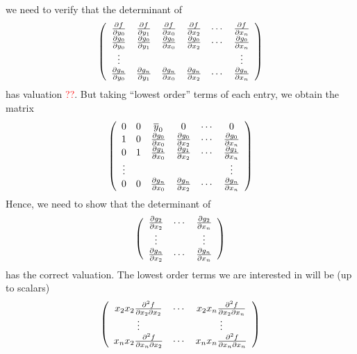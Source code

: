 \documentclass[oneside]{amsart}
\theoremstyle{definition}
\newcommand{\nathan}[1]{\textcolor{red}{#1}}
\begin{document}
we need to verify that the determinant of 
\[
\left(
\begin{array}{c c c c c c}
\frac{\partial f}{\partial y_0} &  \frac{\partial f}{\partial y_1} &  \frac{\partial f}{\partial x_0}  & \frac{\partial f}{\partial x_2} &\cdots &\frac{\partial f}{\partial x_n}\\
\frac{\partial g_0}{\partial y_0} &  \frac{\partial g_0}{\partial y_1} &  \frac{\partial g_0}{\partial x_0}  & \frac{\partial g_0}{\partial x_2} &\cdots &\frac{\partial g_0}{\partial x_n}\\

\vdots&&&&&\vdots\\
\frac{\partial g_n}{\partial y_0} &  \frac{\partial g_n}{\partial y_1} &  \frac{\partial g_n}{\partial x_0}  & \frac{\partial g_n}{\partial x_2} &\cdots &\frac{\partial g_n}{\partial x_n}\\
\end{array}
\right)
\]
has valuation \nathan{??}. But taking ``lowest order'' terms of each entry, we obtain the matrix 
\[
\left(
\begin{array}{c c c c c c}
0 &  0 &  \overline{y}_0  & 0 &\cdots & 0\\
1 &  0 &  \frac{\partial g_0}{\partial x_0}  & \frac{\partial g_0}{\partial x_2} &\cdots &\frac{\partial g_0}{\partial x_n}\\
0 &  1 &  \frac{\partial g_1}{\partial x_0}  & \frac{\partial g_1}{\partial x_2} &\cdots &\frac{\partial g_1}{\partial x_n}\\

\vdots&&&&&\vdots\\
0 &  0 &  \frac{\partial g_n}{\partial x_0}  & \frac{\partial g_n}{\partial x_2} &\cdots &\frac{\partial g_n}{\partial x_n}\\
\end{array}
\right)
\]
Hence, we need to show that the determinant of 
\[
\left(
\begin{array}{  c c c}
\frac{\partial g_2}{\partial x_2} &\cdots &\frac{\partial g_2}{\partial x_n}\\

\vdots&&\vdots\\
 \frac{\partial g_n}{\partial x_2} &\cdots &\frac{\partial g_n}{\partial x_n}\\
\end{array}
\right)
\]
has the correct valuation.
The lowest order terms we are interested in will be (up to scalars)
\[
\left(
\begin{array}{  c c c}
x_2x_2\frac{\partial^2 f}{\partial x_2\partial x_2} &\cdots &x_2x_n\frac{\partial^2 f}{\partial x_2\partial x_n}\\

\vdots&&\vdots\\
x_nx_2\frac{\partial^2 f}{\partial x_n\partial x_2} &\cdots &x_nx_n\frac{\partial^2 f}{\partial x_n\partial x_n}\\
\end{array}
\right)
\]
\end{document}

